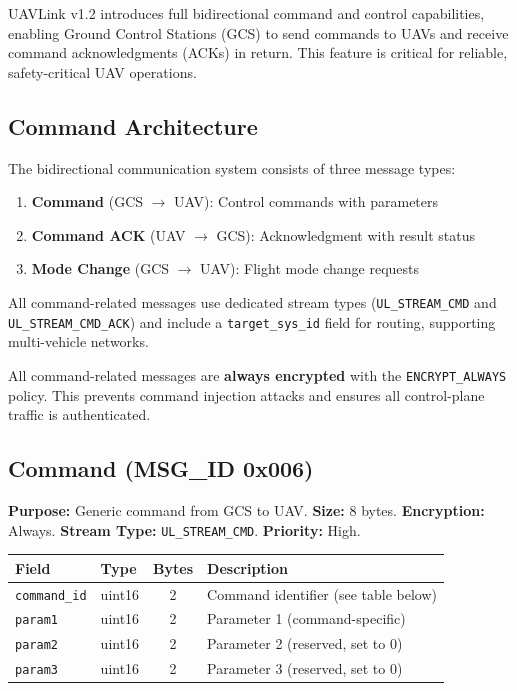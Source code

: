 \documentclass[11pt,a4paper]{article}
\begin{document}
UAVLink v1.2 introduces full bidirectional command and control capabilities, enabling Ground Control Stations (GCS) to send commands to UAVs and receive command acknowledgments (ACKs) in return. This feature is critical for reliable, safety-critical UAV operations.

\subsection{Command Architecture}

The bidirectional communication system consists of three message types:

\begin{enumerate}[noitemsep]
    \item \textbf{Command} (GCS $\to$ UAV): Control commands with parameters
    \item \textbf{Command ACK} (UAV $\to$ GCS): Acknowledgment with result status
    \item \textbf{Mode Change} (GCS $\to$ UAV): Flight mode change requests
\end{enumerate}

All command-related messages use dedicated stream types (\texttt{UL\_STREAM\_CMD} and \texttt{UL\_STREAM\_CMD\_ACK}) and include a \texttt{target\_sys\_id} field for routing, supporting multi-vehicle networks.

\begin{alertbox}
All command-related messages are \textbf{always encrypted} with the \texttt{ENCRYPT\_ALWAYS} policy. This prevents command injection attacks and ensures all control-plane traffic is authenticated.
\end{alertbox}

\subsection{Command (MSG\_ID 0x006)}

\textbf{Purpose:} Generic command from GCS to UAV. \textbf{Size:} 8 bytes. \textbf{Encryption:} Always. \textbf{Stream Type:} \texttt{UL\_STREAM\_CMD}. \textbf{Priority:} High.

\begin{table}[H]
\centering
\begin{tabular}{@{}llcl@{}}
\toprule
\textbf{Field} & \textbf{Type} & \textbf{Bytes} & \textbf{Description} \\
\midrule
\texttt{command\_id} & uint16 & 2 & Command identifier (see table below) \\
\texttt{param1}      & uint16 & 2 & Parameter 1 (command-specific) \\
\texttt{param2}      & uint16 & 2 & Parameter 2 (reserved, set to 0) \\
\texttt{param3}      & uint16 & 2 & Parameter 3 (reserved, set to 0) \\
\bottomrule
\end{tabular}
\end{table}
\end{document}
